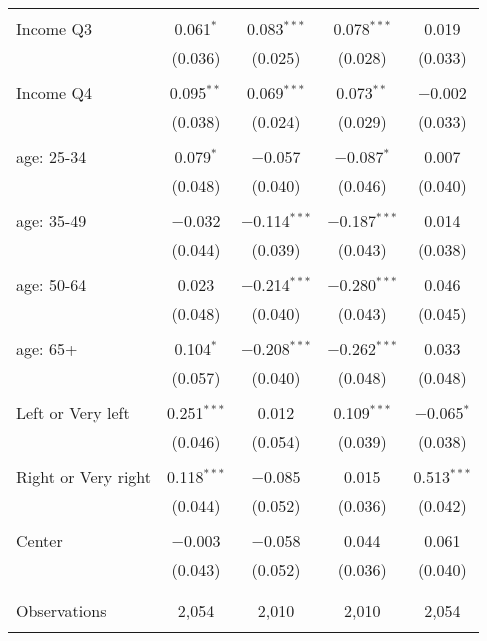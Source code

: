 \begin{tabular}{@{\extracolsep{5pt}}lcccc}
  & & & & \\ 
 Income Q3 & 0.061$^{*}$ & 0.083$^{***}$ & 0.078$^{***}$ & 0.019 \\ 
  & (0.036) & (0.025) & (0.028) & (0.033) \\ 
  & & & & \\ 
 Income Q4 & 0.095$^{**}$ & 0.069$^{***}$ & 0.073$^{**}$ & $-$0.002 \\ 
  & (0.038) & (0.024) & (0.029) & (0.033) \\ 
  & & & & \\ 
 age: 25-34 & 0.079$^{*}$ & $-$0.057 & $-$0.087$^{*}$ & 0.007 \\ 
  & (0.048) & (0.040) & (0.046) & (0.040) \\ 
  & & & & \\ 
 age: 35-49 & $-$0.032 & $-$0.114$^{***}$ & $-$0.187$^{***}$ & 0.014 \\ 
  & (0.044) & (0.039) & (0.043) & (0.038) \\ 
  & & & & \\ 
 age: 50-64 & 0.023 & $-$0.214$^{***}$ & $-$0.280$^{***}$ & 0.046 \\ 
  & (0.048) & (0.040) & (0.043) & (0.045) \\ 
  & & & & \\ 
 age: 65+ & 0.104$^{*}$ & $-$0.208$^{***}$ & $-$0.262$^{***}$ & 0.033 \\ 
  & (0.057) & (0.040) & (0.048) & (0.048) \\ 
  & & & & \\ 
 Left or Very left & 0.251$^{***}$ & 0.012 & 0.109$^{***}$ & $-$0.065$^{*}$ \\ 
  & (0.046) & (0.054) & (0.039) & (0.038) \\ 
  & & & & \\ 
 Right or Very right & 0.118$^{***}$ & $-$0.085 & 0.015 & 0.513$^{***}$ \\ 
  & (0.044) & (0.052) & (0.036) & (0.042) \\ 
  & & & & \\ 
 Center & $-$0.003 & $-$0.058 & 0.044 & 0.061 \\ 
  & (0.043) & (0.052) & (0.036) & (0.040) \\ 
  & & & & \\ 
\hline \\[-1.8ex] 

Observations & 2,054 & 2,010 & 2,010 & 2,054 \\ 
\hline 
\hline \\[-1.8ex] 
\end{tabular} 